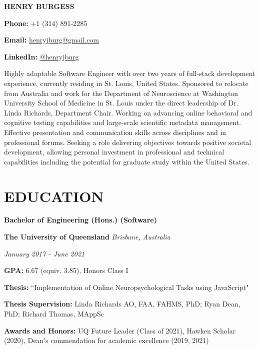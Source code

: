 \documentclass{article}
\begin{document}
  {\Huge\textbf{\uppercase{Henry Burgess}}} \hfill \begin{minipage}{0.26\linewidth}

  \textbf{Phone:} +1 (314) 891-2285

  \textbf{Email:} \href{mailto:henryjburg@gmail.com}{\color{blue}\underline{henryjburg@gmail.com}}

  \textbf{LinkedIn:} \href{https://www.linkedin.com/in/henryjburg/}{\color{blue}\underline{@henryjburg}}

  \end{minipage}

  \medbreak

  Highly adaptable Software Engineer with over two years of full-stack development experience, currently residing in St. Louis, United States.
  Sponsored to relocate from Australia and work for the Department of Neuroscience at Washington University School of Medicine in St. Louis under the direct leadership of Dr. Linda Richards, Department Chair.
  Working on advancing online behavioral and cognitive testing capabilities and large-scale scientific metadata management. Effective presentation and communication skills across disciplines and in professional forums.
  Seeking a role delivering objectives towards positive societal development, allowing personal investment in professional and technical capabilities including the potential for graduate study within the United States.

  \section*{\centering\uppercase{Education}}

  {\large\textbf{Bachelor of Engineering (Hons.) (Software)}}

  \medbreak

  \textbf{The University of Queensland} \hfill \textit{Brisbane, Australia}

  \textit{January 2017 - June 2021}

  \textbf{GPA:} 6.67 (equiv. 3.85), Honors Class I

  \textbf{Thesis:} ``Implementation of Online Neuropsychological Tasks using JavaScript"

  \textbf{Thesis Supervision:} Linda Richards AO, FAA, FAHMS, PhD; Ryan Dean, PhD; Richard Thomas, MAppSc

  \textbf{Awards and Honors:} UQ Future Leader (Class of 2021), Hawken Scholar (2020), Dean's commendation for academic excellence (2019, 2021)
\end{document}
